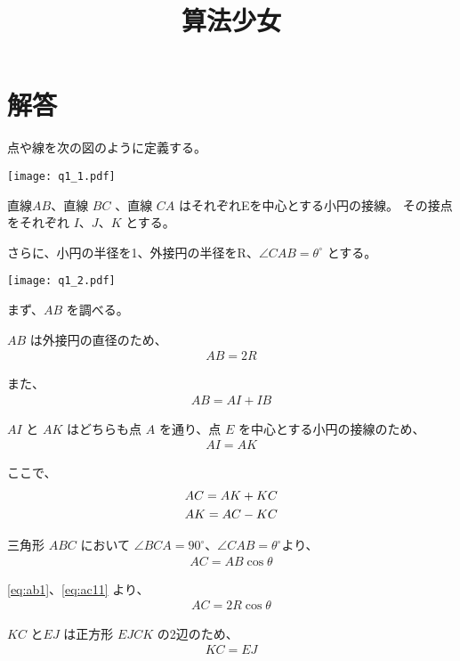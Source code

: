 \documentclass{jsarticle}
\begin{document}
\title{算法少女}
\author{}
\date{}



\section*{解答}

点や線を次の図のように定義する。

\begin{center}
\texttt{[image: q1\_1.pdf]}
\end{center}

直線$AB$、直線 $BC$ 、直線 $CA$ はそれぞれEを中心とする小円の接線。
その接点をそれぞれ $I$、$J$、$K$ とする。

さらに、小円の半径を1、外接円の半径をR、${\angle}CAB=\theta^{\circ}$ とする。

\begin{center}
\texttt{[image: q1\_2.pdf]}
\end{center}

\newpage

まず、$AB$ を調べる。

$AB$ は外接円の直径のため、
\begin{gather}
 AB = 2R  \label{eq:ab1}
\end{gather}

また、
\begin{gather}
 AB = AI + IB  \label{eq:ab21}
\end{gather}

$AI$ と $AK$ はどちらも点 $A$ を通り、点 $E$ を中心とする小円の接線のため、
\begin{gather}
 AI = AK \label{eq:ai1}
\end{gather}

ここで、
\begin{gather}
 AC = AK + KC \notag \\
 AK = AC - KC \label{eq:ak1}
\end{gather}

三角形 $ABC$ において ${\angle}BCA = 90^{\circ}、{\angle}CAB = {\theta}^{\circ}$より、
\begin{gather}
 AC = AB{\cos}{\theta} \label{eq:ac11}
\end{gather}

\ref{eq:ab1}、\ref{eq:ac11} より、
\begin{gather}
 AC = 2R{\cos}{\theta} \label{eq:ac1}
\end{gather}

$KC$ と$EJ$ は正方形 $EJCK$ の2辺のため、
\begin{gather}
 KC = EJ \label{eq:kc1}
\end{gather}
\end{document}
